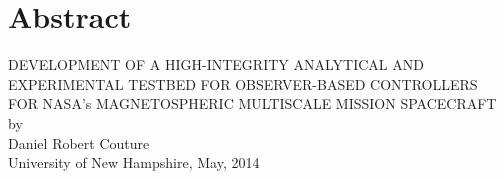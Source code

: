 
\pagebreak
\chapter*{Abstract}
\label{chap:abstract}

\begin{center}
DEVELOPMENT OF A HIGH-INTEGRITY ANALYTICAL AND EXPERIMENTAL TESTBED FOR OBSERVER-BASED CONTROLLERS FOR NASA's MAGNETOSPHERIC MULTISCALE MISSION SPACECRAFT \\
by\\
Daniel Robert Couture\\
University of New Hampshire, May, 2014\\
\vspace{0.4cm}
\end{center}





%
%




